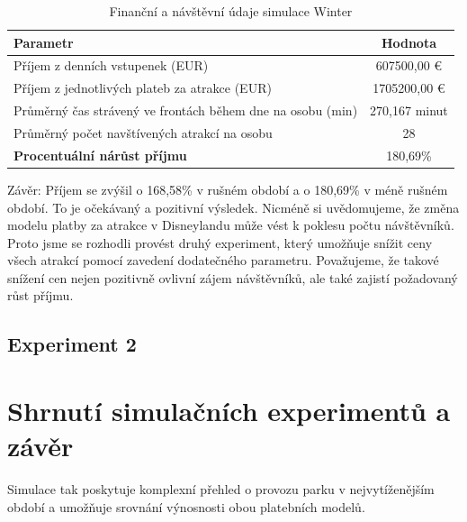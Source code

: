 \documentclass[a4paper,12pt]{article}
\begin{document}
\begin{table}[h!]
	\centering
	\caption{Finanční a návštěvní údaje simulace Winter}
	\label{tab:financial_and_visit_data}
	\begin{tabular}{|l|c|}
		\hline
		\textbf{Parametr}                                         & \textbf{Hodnota} \\ \hline
		Příjem z denních vstupenek (EUR)                          & 607500,00 €   \\ \hline
		Příjem z jednotlivých plateb za atrakce (EUR)             & 1705200,00 €   \\ \hline
		Průměrný čas strávený ve frontách během dne na osobu (min) & 270,167 minut     \\ \hline
		Průměrný počet navštívených atrakcí na osobu             & 28               \\ \hline
		\textbf{Procentuální nárůst příjmu}                       & 180,69\%         \\ \hline
	\end{tabular}
\end{table}


Závěr: Příjem se zvýšil o 168,58\% v rušném období a o 180,69\%  v méně rušném období. To je očekávaný a pozitivní výsledek. Nicméně si uvědomujeme, že změna modelu platby za atrakce v Disneylandu může vést k poklesu počtu návštěvníků. Proto jsme se rozhodli provést druhý experiment, který umožňuje snížit ceny všech atrakcí pomocí zavedení dodatečného parametru. Považujeme, že takové snížení cen nejen pozitivně ovlivní zájem návštěvníků, ale také zajistí požadovaný růst příjmu.

\subsection{Experiment 2}

\section{Shrnutí simulačních experimentů a závěr}
Simulace tak poskytuje komplexní přehled o provozu parku v nejvytíženějším období a umožňuje srovnání výnosnosti obou platebních modelů.

 
\end{document}
